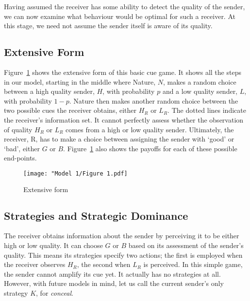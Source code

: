 \documentclass[a4paper,12pt]{article}
\numberwithin{equation}{section}
\begin{document}
Having assumed the receiver has some ability to detect the quality of the sender, we can now examine what behaviour would be optimal for such a receiver. At this stage, we need not assume the sender itself is aware of its quality.


\subsection{Extensive Form}
\label{sec:Basic Cue Game/Extensive Form}

Figure~\ref{fig:Model 1/Figure 1.pdf} shows the extensive form of this basic cue game. It shows all the steps in our model, starting in the middle where Nature, $N$, makes a random choice between a high quality sender, $H$, with probability $p$ and a low quality sender, $L$, with probability $1-p$. Nature then makes another random choice between the two possible cues the receiver obtains, either $H_{R}$ or $L_{R}$. The dotted lines indicate the receiver's information set. It cannot perfectly assess whether the observation of quality $H_{R}$ or $L_{R}$ comes from a high or low quality sender. Ultimately, the receiver, R, has to make a choice between assigning the sender with `good' or `bad', either $G$ or $B$. Figure~\ref{fig:Model 1/Figure 1.pdf} also shows the payoffs for each of these possible end-points.

\begin{figure}[h]
\begin{center}
\leavevmode
\texttt{[image: "Model 1/Figure 1.pdf]}
\caption{Extensive form}
\label{fig:Model 1/Figure 1.pdf}
\end{center}
\end{figure}


\subsection{Strategies and Strategic Dominance}
\label{sec:Basic Cue Game/Strategic Dominance}

The receiver obtains information about the sender by perceiving it to be either high or low quality. It can choose $G$ or $B$ based on its assessment of the sender's quality. This means its strategies specify two actions; the first is employed when the receiver observes $H_{R}$, the second when $L_{R}$ is perceived. In this simple game, the sender cannot amplify its cue yet. It actually has no strategies at all. However, with future models in mind, let us call the current sender's only strategy $K$, for \textit{conceal}.
\end{document}
